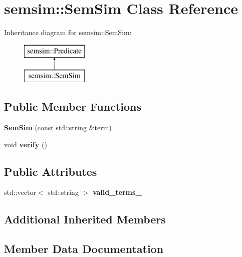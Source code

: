 \hypertarget{classsemsim_1_1SemSim}{}\section{semsim\+:\+:Sem\+Sim Class Reference}
\label{classsemsim_1_1SemSim}
Inheritance diagram for semsim\+:\+:Sem\+Sim\+:\begin{figure}[H]
\begin{center}
\leavevmode
\includegraphics[height=2.000000cm]{classsemsim_1_1SemSim}
\end{center}
\end{figure}
\subsection*{Public Member Functions}
\begin{DoxyCompactItemize}
\item 
\mbox{\label{classsemsim_1_1SemSim_ad9f48f4dde6bc27789826a29adf203ab}} 
{\bfseries Sem\+Sim} (const std\+::string \&term)
\item 
\mbox{\label{classsemsim_1_1SemSim_a8df80cef39d98e83dab0c8c7bdae5d47}} 
void {\bfseries verify} ()
\end{DoxyCompactItemize}
\subsection*{Public Attributes}
\begin{DoxyCompactItemize}
\item 
std\+::vector$<$ std\+::string $>$ {\bfseries valid\+\_\+terms\+\_\+}
\end{DoxyCompactItemize}
\subsection*{Additional Inherited Members}


\subsection{Member Data Documentation}
\mbox{\label{classsemsim_1_1SemSim_aa48e26f272827d7737f2bb9236c78102}} 

